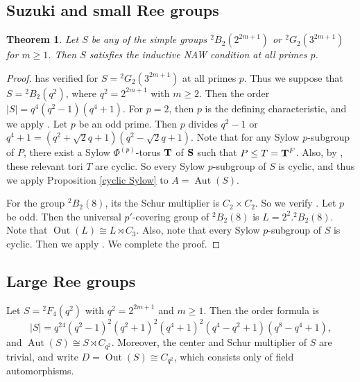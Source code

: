 \documentclass[11pt,a4paper]{article}
\numberwithin{equation}{section}
\newtheorem{theorem}{Theorem}[section]
\theoremstyle{definition}
\theoremstyle{remark}
\newcommand{\Aut}{\operatorname{Aut}}
\newcommand{\Out}{\operatorname{Out}}
\begin{document}
\subsection{Suzuki and small Ree groups}
\begin{theorem}\label{thm:Suzuki}
Let $S$ be any of the simple groups ${}^2B_2(2^{2m+1})$ or
${}^2G_2(3^{2m+1})$ for $m\geq1$. Then $S$ satisfies the inductive NAW condition at all primes $p$.
\end{theorem}
\begin{proof}
\cite[Proposition 10.9] {FFZ} has verified for  $S={}^2G_2(3^{2m+1})$ at all primes $p$. Thus we suppose that $S={}^2B_2(q^2)$, where $q^2=2^{2m+1}$ with $m\geq 2$. Then the order $|S|=q^4(q^2-1)(q^4+1)$. For $p=2$, then $p$ is the defining characteristic, and we apply \cite[Theorem C]{FFZ}. Let $p$ be an odd prime. Then $p$ divides $q^2-1$ or $q^4+1=(q^2+\sqrt{2}q+1)(q^2-\sqrt{2}q+1)$. Note that for any Sylow $p$-subgroup of $P$, 
there exist a Sylow $\Phi^{(p)}$-torus $\bf T$ of ${\bf S}$ such that $P\leq T={\bf T}^F$.  Also, by \cite[Section 16]{I2007}, these relevant tori $T$ are cyclic. So every Sylow $p$-subgroup of $S$ is cyclic, and thus we apply Proposition \ref{cyclic Sylow} to $A=\Aut(S)$.

For the group ${}^2B_2(8)$, its the Schur multiplier is $C_2\times C_2$. So we verify \cite[Proposition 9.1]{FFZ}. Let $p$ be odd. Then the universal $p'$-covering group of ${}^2B_2(8)$ is  $L=2^2.{}^2B_2(8)$.  Note that $\Out(L)\cong L\rtimes C_3$. Also, note that every Sylow $p$-subgroup of $S$ is cyclic. Then we apply \cite[Corollary 10.4]{FFZ}. We complete the proof.
\end{proof}
\subsection{Large Ree groups}
Let $S={}^2F_4(q^2)$ with $q^2=2^{2m+1}$ and $m\geq 1$.  Then the order formula is
\[
|S|=q^{24}(q^2-1)^2(q^2+1)^2(q^4+1)^2(q^4-q^2+1)(q^8-q^4+1),
\]
and $\Aut(S)\cong S\rtimes C_{q^2}$. Moreover, the center and Schur multiplier of $S$ are trivial, and write $D=\Out(S)\cong C_{q^2}$, which consists only of  field automorphisms. 
\end{document}
